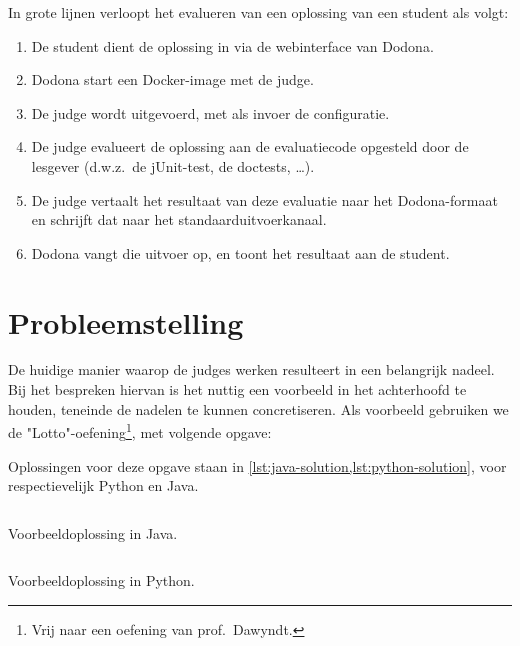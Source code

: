 In grote lijnen verloopt het evalueren van een oplossing van een student als volgt:

\begin{enumerate}
    \item De student dient de oplossing in via de webinterface van Dodona.
    \item Dodona start een Docker-image met de judge.
    \item De judge wordt uitgevoerd, met als invoer de configuratie.
    \item De judge evalueert de oplossing aan de evaluatiecode opgesteld door de lesgever (d.w.z.\ de jUnit-test, de doctests, \ldots).
    \item De judge vertaalt het resultaat van deze evaluatie naar het Dodona-formaat en schrijft dat naar het standaarduitvoerkanaal.
    \item Dodona vangt die uitvoer op, en toont het resultaat aan de student.
\end{enumerate}

\section{Probleemstelling}\label{sec:probleemstelling}

De huidige manier waarop de judges werken resulteert in een belangrijk nadeel.
Bij het bespreken hiervan is het nuttig een voorbeeld in het achterhoofd te houden, teneinde de nadelen te kunnen concretiseren.
Als voorbeeld gebruiken we de "Lotto"-oefening\footnote{Vrij naar een oefening van prof.\ Dawyndt.}, met volgende opgave:

\begin{quotation}
\end{quotation}

Oplossingen voor deze opgave staan in \cref{lst:java-solution,lst:python-solution}, voor respectievelijk Python en Java.

\begin{listing}
    \inputminted{java}{code/correct-solution.java}
    \caption{Voorbeeldoplossing in Java.}
    \label{lst:java-solution}
\end{listing}

\begin{listing}
    \inputminted{python3}{code/correct-solution.py}
    \caption{Voorbeeldoplossing in Python.}
    \label{lst:python-solution}
\end{listing}

